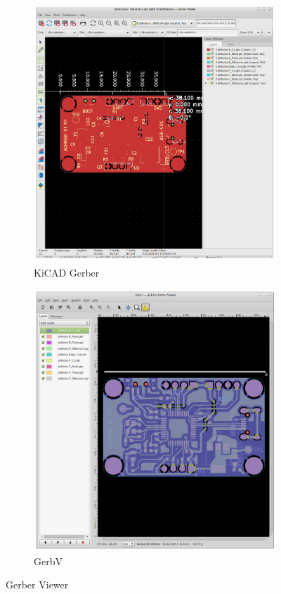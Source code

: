 \documentclass[12pt]{book}
\begin{document}
	\begin{figure}[!ht]
		\centering
		\begin{subfigure}[t]{0.45\textwidth}
			\includegraphics[width=\textwidth]{images/kicad/gerbkicad}
			\caption{KiCAD Gerber}
		\end{subfigure}
		\begin{subfigure}[t]{0.45\textwidth}
			\includegraphics[width=\textwidth]{images/kicad/gerbv}
			\caption{GerbV}
		\end{subfigure}
		\caption{Gerber Viewer}
	\end{figure}
	
\end{document}
